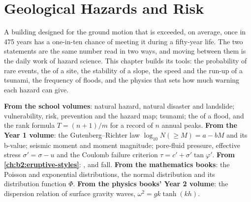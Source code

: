 \chapter{Geological Hazards and Risk}\label{ch:b2:geological-hazards}

A building designed for the ground motion that is exceeded, on average, once in 475 years has a
one-in-ten chance of meeting it during a fifty-year life. The two statements are the same number
read in two ways, and moving between them is the daily work of hazard science. This chapter
builds its tools: the probability of rare events, the  of a site, the stability of a
slope, the speed and the run-up of a tsunami, the frequency of floods, and the physics that sets
how much warning each hazard can give.

\begin{recall}
\textbf{From the school volumes}: natural hazard, natural disaster and landslide; vulnerability,
risk, prevention and the hazard map; tsunami; the  of a flood, and the rank formula
$T = (n + 1)/m$ for a record of $n$ annual peaks. \textbf{From the Year 1 volume}: the
Gutenberg--Richter law $\log_{10} N(\geq M) = a - bM$ and its b-value; seismic moment and moment
magnitude; pore-fluid pressure, effective stress $\sigma' = \sigma - u$ and the Coulomb failure
criterion $\tau = c' + \sigma' \tan\varphi'$. \textbf{From \cref{ch:b2:eruptive-styles}}: ,  and  fall. \textbf{From the mathematics books}: the Poisson and
exponential distributions, the normal distribution and its distribution function $\Phi$.
\textbf{From the physics books' Year 2 volume}: the dispersion relation of surface gravity waves,
$\omega^2 = gk\tanh(kh)$.
\end{recall}

